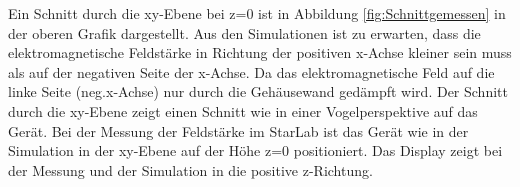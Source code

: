 \newpage
Ein Schnitt durch die xy-Ebene bei z=0 ist in Abbildung \ref{fig:Schnittgemessen} in der oberen Grafik dargestellt. Aus den Simulationen ist zu erwarten, dass die elektromagnetische Feldstärke in Richtung der positiven x-Achse kleiner sein muss als auf der negativen Seite der x-Achse. Da das elektromagnetische Feld auf die linke Seite (neg.x-Achse) nur durch die Gehäusewand gedämpft wird. Der Schnitt durch die xy-Ebene zeigt einen Schnitt wie in einer Vogelperspektive auf das Gerät. Bei der Messung der Feldstärke im StarLab ist das Gerät wie in der Simulation in der xy-Ebene auf der Höhe z=0 positioniert. Das Display zeigt bei der Messung und der Simulation in die positive z-Richtung.    \\
%	

